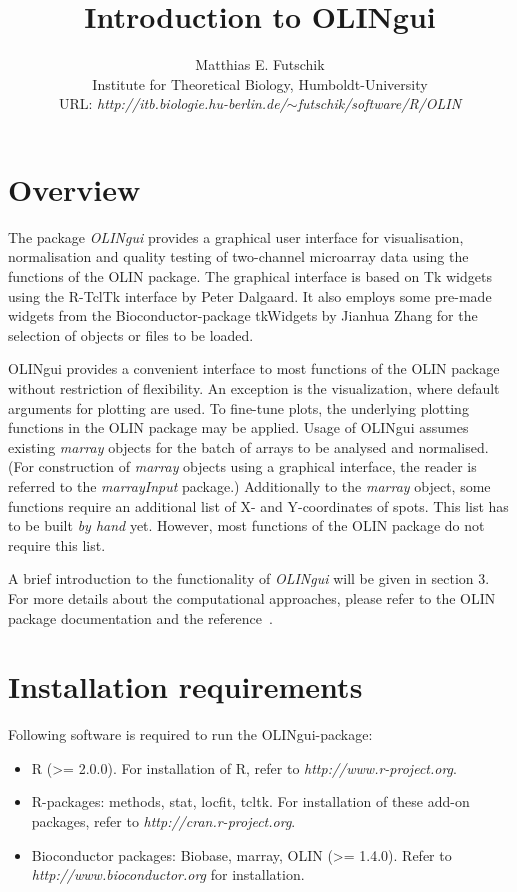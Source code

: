 \documentclass[a4paper,11pt]{article}
\title{Introduction to OLINgui}
\author{Matthias E. Futschik\\ Institute for Theoretical Biology,  Humboldt-University\\ URL: \textit{http://itb.biologie.hu-berlin.de/$\sim$futschik/software/R/OLIN}}
\begin{document}
\maketitle
\tableofcontents

\section{Overview}
The package \emph{OLINgui} provides a graphical user interface for
visualisation, normalisation and quality testing of two-channel microarray data using the  functions of the OLIN package.  
The graphical interface is  based on Tk widgets using the R-TclTk interface by Peter Dalgaard. It also employs
some pre-made widgets from the Bioconductor-package tkWidgets  by Jianhua Zhang for
the selection of objects or files to be loaded. 

OLINgui provides a convenient interface to most functions of the OLIN package without restriction
of flexibility. An exception is the visualization, where default arguments for plotting 
are used. To fine-tune plots, the underlying plotting functions in the OLIN package
may be applied. Usage of OLINgui assumes existing \emph{marray} objects for the batch of arrays to 
be analysed and normalised.  (For construction of \emph{marray} objects using a graphical interface, the reader is referred
 to the \emph{marrayInput} package.) Additionally to the  \emph{marray} object, 
some functions require an additional list of X- and Y-coordinates of spots. 
This list  has to be built \emph{by hand} yet. However, most functions of the OLIN package 
 do not require this list.  

A brief introduction to the  functionality of \emph{OLINgui} will be given in section 3.
For more details about the computational approaches, please refer to the OLIN package documentation
and the reference~\cite{toni}. 


\section{Installation requirements}
Following software is required to run the OLINgui-package:
\begin{itemize} 
\item  R (>= 2.0.0). For installation of R, refer to \textit{http://www.r-project.org}.
\item  R-packages: methods, stat, locfit, tcltk. For installation of these add-on packages, refer to \textit{http://cran.r-project.org}.
\item Bioconductor packages: Biobase, marray, OLIN (>= 1.4.0). Refer to \textit{http://www.bioconductor.org} for installation. 
\end{itemize}
\end{document}
